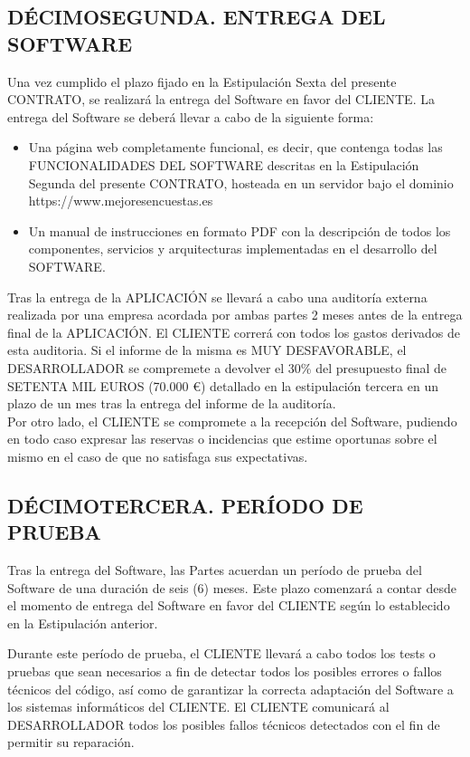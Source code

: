 \documentclass[a4paper,11pt]{report}
\begin{document}
	\subsection*{DÉCIMOSEGUNDA. ENTREGA DEL SOFTWARE}

	Una vez cumplido el plazo fijado en la Estipulación Sexta del presente
	CONTRATO, se realizará la entrega del Software en favor del CLIENTE. La
	entrega del Software se deberá llevar a cabo de la siguiente forma:

    \begin{itemize}
        \item Una página web completamente funcional, es decir, que contenga todas las
	FUNCIONALIDADES DEL SOFTWARE descritas en la Estipulación Segunda del presente
	CONTRATO, hosteada en un servidor bajo el dominio https://www.mejoresencuestas.es
	    \item Un manual de instrucciones en formato PDF con la descripción de todos
	    los componentes, servicios y arquitecturas implementadas en el desarrollo
	    del SOFTWARE.
    \end{itemize}
    
    Tras la entrega de la APLICACIÓN  se llevará a cabo una auditoría externa realizada por una empresa acordada por ambas partes 2 meses antes de la entrega final de la APLICACIÓN. El CLIENTE correrá con todos los gastos derivados de esta auditoria. Si el informe de la misma es MUY DESFAVORABLE, el DESARROLLADOR se compremete a devolver el 30\% del presupuesto final de SETENTA MIL EUROS (70.000 \euro) detallado en la estipulación tercera en un plazo de un mes tras la entrega del informe de la auditoría.
    \\
	Por otro lado, el CLIENTE se compromete a la recepción del Software,
	pudiendo en todo caso expresar las reservas o incidencias que estime
	oportunas sobre el mismo en el caso de que no satisfaga sus
	expectativas.

	\subsection*{DÉCIMOTERCERA. PERÍODO DE PRUEBA}

	Tras la entrega del Software, las Partes acuerdan un período de prueba
	del Software de una duración de seis (6) meses. Este plazo comenzará a contar
	desde el momento de entrega del Software en favor del CLIENTE según lo
	establecido en la Estipulación anterior.

	Durante este período de prueba, el CLIENTE llevará a cabo todos los
	tests o pruebas que sean necesarios a fin de detectar todos los posibles
	errores o fallos técnicos del código, así como de garantizar la correcta
	adaptación del Software a los sistemas informáticos del CLIENTE. El
	CLIENTE comunicará al DESARROLLADOR todos los posibles fallos técnicos
	detectados con el fin de permitir su reparación.
\end{document}
